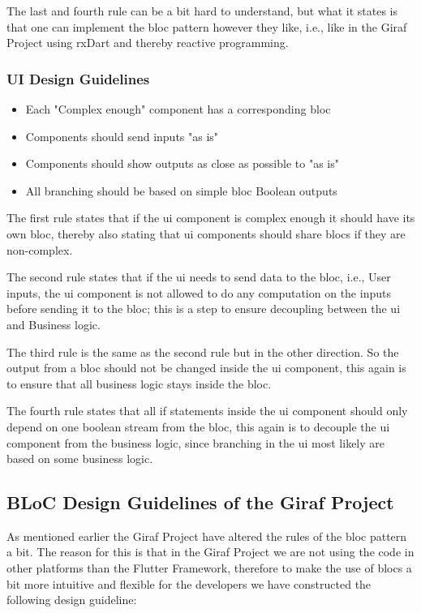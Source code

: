 The last and fourth rule can be a bit hard to understand, but what it states is that one can implement the \gls{bloc} pattern however they like, i.e., like in the Giraf Project using rxDart and thereby reactive programming.

\subsubsection{UI Design Guidelines}
\begin{itemize}
  \item Each "Complex enough" component has a corresponding \gls{bloc}
  \item Components should send inputs "as is"
  \item Components should show outputs as close as possible to "as is"
  \item All branching should be based on simple \gls{bloc} Boolean outputs
\end{itemize}

The first rule states that if the \gls{ui} component is complex enough it should have its own \gls{bloc}, thereby also stating that \gls{ui} components should share \glspl{bloc} if they are non-complex.

The second rule states that if the \gls{ui} needs to send data to the \gls{bloc}, i.e., User inputs, the \gls{ui} component is not allowed to do any computation on the inputs before sending it to the \gls{bloc}; this is a step to ensure decoupling between the \gls{ui} and Business logic.

The third rule is the same as the second rule but in the other direction. So the output from a \gls{bloc} should not be changed inside the \gls{ui} component, this again is to ensure that all business logic stays inside the \gls{bloc}.

The fourth rule states that all if statements inside the \gls{ui} component should only depend on one boolean stream from the \gls{bloc}, this again is to decouple the \gls{ui} component from the business logic, since branching in the \gls{ui} most likely are based on some business logic.

\subsection{BLoC Design Guidelines of the Giraf Project}
As mentioned earlier the Giraf Project have altered the rules of the \gls{bloc} pattern a bit. The reason for this is that in the Giraf Project we are not using the code in other platforms than the Flutter Framework, therefore to make the use of \glspl{bloc} a bit more intuitive and flexible for the developers we have constructed the following design guideline:

